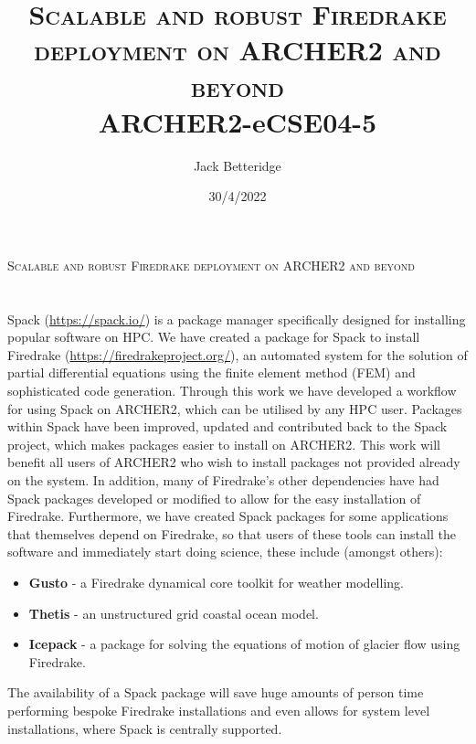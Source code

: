 \documentclass[a4paper,11pt]{article}
\title{\textsc{Scalable and robust Firedrake deployment on ARCHER2 and beyond}\\
\Large ARCHER2-eCSE04-5}
\author{Jack Betteridge}
\date{30/4/2022}
\begin{document}


\begin{center}\huge\textsc{Scalable and robust Firedrake deployment on ARCHER2 and beyond}\end{center}
\section*{}
\label{sec:intro}
Spack (\url{https://spack.io/}) is a package manager specifically designed for installing popular software on HPC.
We have created a package for Spack to install Firedrake (\url{https://firedrakeproject.org/}), an automated system for the solution of partial differential equations using the finite element method (FEM) and sophisticated code generation.
Through this work we have developed a workflow for using Spack on ARCHER2, which can be utilised by any HPC user.
Packages within Spack have been improved, updated and contributed back to the Spack project, which makes packages easier to install on ARCHER2.
This work will benefit all users of ARCHER2 who wish to install packages not provided already on the system.
In addition, many of Firedrake's other dependencies have had Spack packages developed or modified to allow for the easy installation of Firedrake.
Furthermore, we have created Spack packages for some applications that themselves depend on Firedrake, so that users of these tools can install the software and immediately start doing science, these include (amongst others):
\begin{itemize}[topsep=2pt, partopsep=0pt, itemsep=1pt, parsep=1pt]
	\item \textbf{Gusto} - a Firedrake dynamical core toolkit for weather modelling.
	\item \textbf{Thetis} - an unstructured grid coastal ocean model.
	\item \textbf{Icepack} - a package for solving the equations of motion of glacier flow using Firedrake.
\end{itemize}
The availability of a Spack package will save huge amounts of person time performing bespoke Firedrake installations and even allows for system level installations, where Spack is centrally supported.
\end{document}
